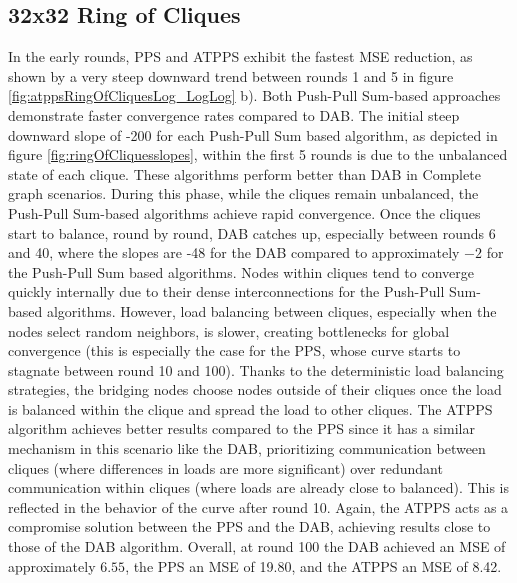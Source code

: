 \subsection{32x32 Ring of Cliques}\label{subsec:32_32ROC}
In the early rounds, PPS and ATPPS exhibit the fastest MSE reduction, as shown by a very steep downward trend between rounds 1 and 5 in figure \ref{fig:atppsRingOfCliquesLog_LogLog} b). Both Push-Pull Sum-based approaches demonstrate faster convergence rates compared to DAB. The initial steep downward slope of -200 for each Push-Pull Sum based algorithm, as depicted in figure \ref{fig:ringOfCliquesslopes}, within the first 5 rounds is due to the unbalanced state of each clique. These algorithms perform better than DAB in Complete graph scenarios. During this phase, while the cliques remain unbalanced, the Push-Pull Sum-based algorithms achieve rapid convergence. Once the cliques start to balance, round by round, DAB catches up, especially between rounds 6 and 40, where the slopes are -48 for the DAB compared to approximately $-2$ for the Push-Pull Sum based algorithms. Nodes within cliques tend to converge quickly internally due to their dense interconnections for the Push-Pull Sum-based algorithms. However, load balancing between cliques, especially when the nodes select random neighbors, is slower, creating bottlenecks for global convergence (this is especially the case for the PPS, whose curve starts to stagnate between round 10 and 100). Thanks to the deterministic load balancing strategies, the bridging nodes choose nodes outside of their cliques once the load is balanced within the clique and spread the load to other cliques. The ATPPS algorithm achieves better results compared to the PPS since it has a similar mechanism in this scenario like the DAB, prioritizing communication between cliques (where differences in loads are more significant) over redundant communication within cliques (where loads are already close to balanced). This is reflected in the behavior of the curve after round 10. Again, the ATPPS acts as a compromise solution between the PPS and the DAB, achieving results close to those of the DAB algorithm. Overall, at round 100 the DAB achieved an MSE of approximately $6.55$, the PPS an MSE of 19.80, and the ATPPS an MSE of 8.42.

